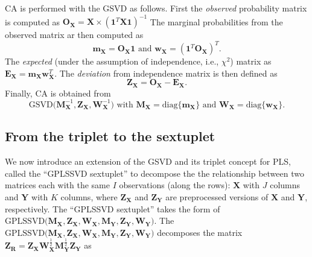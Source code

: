 \documentclass[12pt]{article}
\begin{document}
CA is performed with the GSVD as follows. First the \emph{observed}
probability matrix is computed as
\({\mathbf O}_{\mathbf X} = {\mathbf X} \times ({\mathbf 1}^{T}{\mathbf X} {\mathbf 1})^{-1}\)
The marginal probabilities from the observed matrix ar then computed as
\begin{equation}
{\mathbf m}_{\mathbf X} = {\mathbf O}_{\mathbf X}{\mathbf 1} 
\text{ and } 
{\mathbf w}_{\mathbf X} = ({\mathbf 1}^{T}{\mathbf O}_{\mathbf X})^{T}.
\end{equation} The \emph{expected} (under the assumption of
independence, i.e., \(\chi^2\)) matrix as
\({\mathbf E}_{\mathbf X} = {\mathbf m}_{\mathbf X}{\mathbf w}_{\mathbf X}^{T}\).
The \emph{deviation} from independence matrix is then defined as
\begin{equation}
{\mathbf Z}_{\mathbf X} 
= {\mathbf O}_{\mathbf X} - {\mathbf E}_{\mathbf X}.
\end{equation} Finally, CA is obtained from
\begin{equation}\label{eq:CAasGSVD}
\mathrm{GSVD(} {\mathbf M}_{\mathbf X}^{-1}, 
{\mathbf Z}_{\mathbf X}, {\mathbf W}_{\mathbf X}^{-1} \mathrm{)}
\textrm{ with }
{\mathbf M}_{\mathbf X} 
=  \mathrm{diag\{} {\mathbf m}_{\mathbf X} 
\mathrm{\}} \text{ and } {\mathbf W}_{\mathbf X} 
= \mathrm{diag\{} {\mathbf w}_{\mathbf X} \mathrm{\}}.
\end{equation}

\hypertarget{from-the-triplet-to-the-sextuplet}{%
\subsection{From the triplet to the
sextuplet}\label{from-the-triplet-to-the-sextuplet}}

We now introduce an extension of the GSVD and its triplet concept for
PLS, called the ``GPLSSVD sextuplet'' to decompose the the relationship
between two matrices each with the same \(I\) observations (along the
rows): \({\mathbf X}\) with \(J\) columns and \({\mathbf Y}\) with \(K\)
columns, where \({\mathbf Z}_{\mathbf X}\) and
\({\mathbf Z}_{\mathbf Y}\) are preprocessed versions of \({\mathbf X}\)
and \({\mathbf Y}\), respectively. The ``GPLSSVD sextuplet'' takes the
form of
\(\mathrm{GPLSSVD(} {\mathbf M}_{\mathbf X}, {\mathbf Z}_{\mathbf X}, {\mathbf W}_{\mathbf X}, {\mathbf M}_{\mathbf Y}, {\mathbf Z}_{\mathbf Y}, {\mathbf W}_{\mathbf Y} \mathrm{)}\).
The
\(\mathrm{GPLSSVD(} {\mathbf M}_{\mathbf X}, {\mathbf Z}_{\mathbf X}, {\mathbf W}_{\mathbf X}, {\mathbf M}_{\mathbf Y}, {\mathbf Z}_{\mathbf Y}, {\mathbf W}_{\mathbf Y} \mathrm{)}\)
decomposes the matrix
\({\mathbf Z}_{\mathbf R} = {\mathbf Z}_{\mathbf X} {\mathbf W}_{\mathbf X}^{\frac{1}{2}} {\mathbf M}_{\mathbf Y}^{\frac{1}{2}} {\mathbf Z}_{\mathbf Y}\)
as
\end{document}
